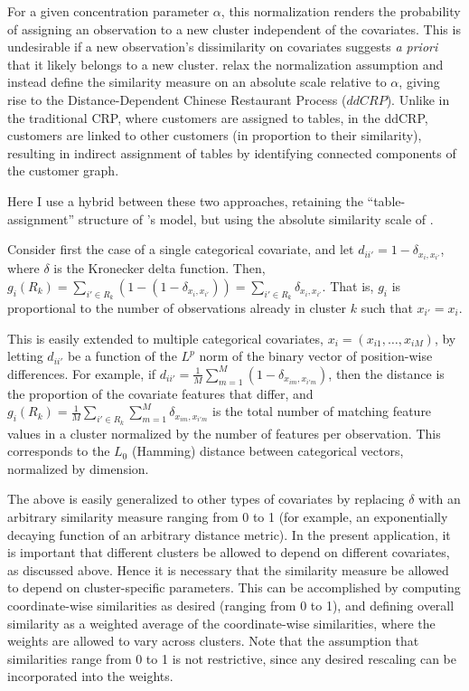 \documentclass[12pt]{article}
\begin{document}
For a given concentration parameter $\alpha$, this normalization renders the probability of assigning an observation to a new cluster independent of the covariates.  This is undesirable if a new observation's dissimilarity on covariates suggests {\em a priori} that it likely belongs to a new cluster.  \cite{blei2011distance} relax the normalization assumption and instead define the similarity measure on an absolute scale relative to $\alpha$, giving rise to the Distance-Dependent Chinese Restaurant Process ($ddCRP$).  Unlike in the traditional CRP, where customers are assigned to tables, in the ddCRP, customers are linked to other customers (in proportion to their similarity), resulting in indirect assignment of tables by identifying connected components of the customer graph.

Here I use a hybrid between these two approaches, retaining the ``table-assignment'' structure of \cite{dahl2008distance}'s model, but using the absolute similarity scale of \cite{blei2011distance}.

Consider first the case of a single categorical covariate, and let $d_{ii'} = 1 - \delta_{x_i,x_{i'}}$, where $\delta$ is the Kronecker delta function.  Then, $g_i(R_k) = \sum_{i' \in R_k} \left(1 - (1 - \delta_{x_i,x_{i'}})\right) = \sum_{i' \in R_k} \delta_{x_i,x_{i'}}$.  That is, $g_i$ is proportional to the number of observations already in cluster $k$ such that $x_{i'} = x_i$.

This is easily extended to multiple categorical covariates, $x_i = (x_{i1},\dots,x_{iM})$, by letting $d_{ii'}$ be a function of the $L^p$ norm of the binary vector of position-wise differences.  For example, if $d_{ii'} = \frac{1}{M} \sum_{m=1}^M (1 - \delta_{x_{im},x_{i'm}})$, then the distance is the proportion of the covariate features that differ, and $g_i(R_k) = \frac{1}{M} \sum_{i' \in R_k} \sum_{m=1}^M \delta_{x_{im},x_{i'm}}$ is the total number of matching feature values in a cluster normalized by the number of features per observation.  This corresponds to the $L_0$ (Hamming) distance between categorical vectors, normalized by dimension.  

The above is easily generalized to other types of covariates by replacing $\delta$ with an arbitrary similarity measure ranging from 0 to 1 (for example, an exponentially decaying function of an arbitrary distance metric).  In the present application, it is important that different clusters be allowed to depend on different covariates, as discussed above.  Hence it is necessary that the similarity measure be allowed to depend on cluster-specific parameters.  This can be accomplished by computing coordinate-wise similarities as desired (ranging from 0 to 1), and defining overall similarity as a weighted average of the coordinate-wise similarities, where the weights are allowed to vary across clusters.  Note that the assumption that similarities range from 0 to 1 is not restrictive, since any desired rescaling can be incorporated into the weights.
\end{document}

